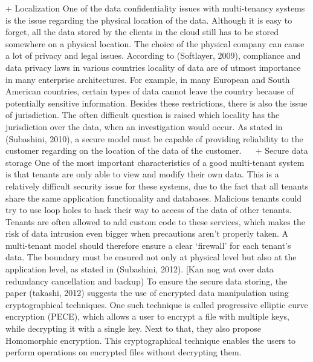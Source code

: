 + Localization
One of the data confidentiality issues with multi-tenancy systems is the issue regarding the physical location of the data. Although it is easy to forget, all the data stored by the clients in the cloud still has to be stored somewhere on a physical location. The choice of the physical company can cause a lot of privacy and legal issues. According to (Softlayer, 2009), compliance and data privacy laws in various countries locality of data are of utmost importance in many enterprise architectures. For example, in many European and South American countries, certain types of data cannot leave the country because of potentially sensitive information. Besides these restrictions, there is also the issue of jurisdiction. The often difficult question is raised which locality has the jurisdiction over the data, when an investigation would occur. As stated in (Subashini, 2010), a secure model must be capable of providing reliability to the customer regarding on the location of the data of the customer.
 
+ Secure data storage
One of the most important characteristics of a good multi-tenant system is that tenants are only able to view and modify their own data. This is a relatively difficult security issue for these systems, due to the fact that all tenants share the same application functionality and databases. Malicious tenants could try to use loop holes to hack their way to access of the data of other tenants. Tenants are often allowed to add custom code to these services, which makes the risk of data intrusion even bigger when precautions aren’t properly taken. A multi-tenant model should therefore ensure a clear ‘firewall’ for each tenant’s data. The boundary must be ensured not only at physical level but also at the application level, as stated in (Subashini, 2012). [Kan nog wat over data redundancy cancellation and backup)
To ensure the secure data storing, the paper (takashi, 2012) suggests the use of encrypted data manipulation using cryptographical techniques. One such technique is called progressive elliptic curve encryption (PECE), which allows a user to encrypt a file with multiple keys, while decrypting it with a single key. Next to that, they also propose Homomorphic encryption. This cryptographical technique enables the users to perform operations on encrypted files without decrypting them.

